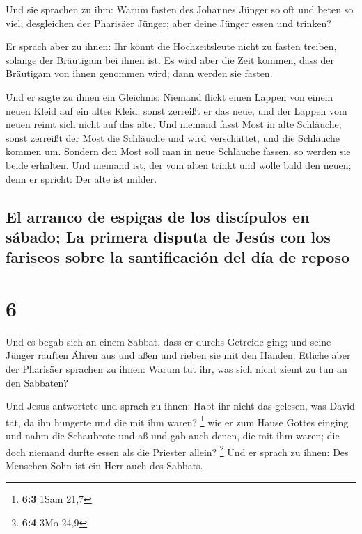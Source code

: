  Und sie sprachen zu ihm: Warum fasten des Johannes
Jünger so oft und beten so viel, desgleichen der Pharisäer Jünger; aber
deine Jünger essen und trinken?

 Er sprach aber zu ihnen: Ihr könnt die Hochzeitsleute
nicht zu fasten treiben, solange der Bräutigam bei ihnen ist.
 Es wird aber die Zeit kommen, dass der Bräutigam von
ihnen genommen wird; dann werden sie fasten.

 Und er sagte zu ihnen ein Gleichnis: Niemand flickt
einen Lappen von einem neuen Kleid auf ein altes Kleid; sonst zerreißt
er das neue, und der Lappen vom neuen reimt sich nicht auf das alte.
 Und niemand fasst Most in alte Schläuche; sonst zerreißt
der Most die Schläuche und wird verschüttet, und die Schläuche kommen
um.  Sondern den Most soll man in neue Schläuche fassen,
so werden sie beide erhalten.  Und niemand ist, der vom
alten trinkt und wolle bald den neuen; denn er spricht: Der alte ist
milder.

\hypertarget{el-arranco-de-espigas-de-los-discuxedpulos-en-suxe1bado-la-primera-disputa-de-jesuxfas-con-los-fariseos-sobre-la-santificaciuxf3n-del-duxeda-de-reposo}{%
\subsection{El arranco de espigas de los discípulos en sábado; La
primera disputa de Jesús con los fariseos sobre la santificación del día
de
reposo}\label{el-arranco-de-espigas-de-los-discuxedpulos-en-suxe1bado-la-primera-disputa-de-jesuxfas-con-los-fariseos-sobre-la-santificaciuxf3n-del-duxeda-de-reposo}}

\hypertarget{section-5}{%
\section{6}\label{section-5}}

 Und es begab sich an einem Sabbat, dass er durchs
Getreide ging; und seine Jünger rauften Ähren aus und aßen und rieben
sie mit den Händen.  Etliche aber der Pharisäer sprachen
zu ihnen: Warum tut ihr, was sich nicht ziemt zu tun an den Sabbaten?

 Und Jesus antwortete und sprach zu ihnen: Habt ihr nicht
das gelesen, was David tat, da ihn hungerte und die mit ihm waren?
\footnote{\textbf{6:3} 1Sam 21,7}  wie er zum Hause Gottes
einging und nahm die Schaubrote und aß und gab auch denen, die mit ihm
waren; die doch niemand durfte essen als die Priester allein?
\footnote{\textbf{6:4} 3Mo 24,9}  Und er sprach zu ihnen:
Des Menschen Sohn ist ein Herr auch des Sabbats.

